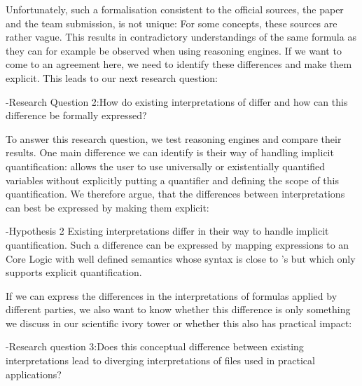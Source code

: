 Unfortunately, such a formalisation consistent to the official sources, the paper and the \wwwc team submission,  is not unique:
For some concepts, these sources are rather vague. This results in contradictory understandings of the same formula as they can for example be observed 
when using \nthree reasoning engines.
If we want to come to an agreement here, we need to identify these differences and make them explicit. This leads to our next research question:

\hyp{Research Question 2:}{How do existing interpretations of \nthree differ and how can this difference be formally expressed?}

To answer this research question, we test reasoning engines and compare their results. One main difference we can identify is their way of handling 
implicit quantification: \nthreelogic allows the user to use universally or existentially quantified variables 
without explicitly putting a quantifier and defining the scope of this quantification. We therefore argue, that the differences between interpretations can best be expressed 
by making them explicit:


\hyp{Hypothesis 2}{ Existing interpretations differ in their way to handle implicit quantification. 
Such a difference can be expressed by mapping \nthree expressions to an \nthree Core Logic  with well defined semantics
whose syntax is close to \nthree's but which only supports explicit quantification.}

% 
% 
If we can express the differences in the interpretations of \nthree formulas applied by different parties, we also want to know whether this difference is only something we discuss 
in our scientific ivory tower or whether this also has practical impact:

\hyp{Research question 3:}{Does this conceptual difference between existing interpretations lead to diverging interpretations of files used in practical applications?} 

